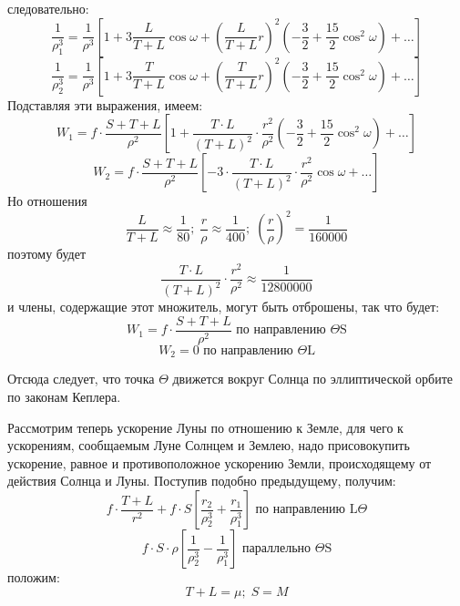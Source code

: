 \documentclass[a4paper,12pt]{article}
\begin{document}
\noindent следовательно:
\[ \frac{1}{\rho_1^3} = \frac{1}{\rho^3} \left[ 1+3\frac{L}{T+L}\cos{\omega} + \left(\frac{L}{T+L} r\right)^2\left(-\frac{3}{2} + \frac{15}{2}\cos^2{\omega} \right) + \ldots\right]\]
\[ \frac{1}{\rho_2^3} = \frac{1}{\rho^3} \left[ 1+3\frac{T}{T+L}\cos{\omega} + \left(\frac{T}{T+L} r\right)^2\left(-\frac{3}{2} + \frac{15}{2}\cos^2{\omega} \right) + \ldots\right]\]
Подставляя эти выражения, имеем:
\[ W_1 = f \cdot \frac{S+T+L}{\rho^2} \left[1+\frac{T \cdot L}{\left( T + L \right)^2} \cdot \frac{r^2}{\rho^2} \left(-\frac{3}{2} + \frac{15}{2} \cos^2{\omega} \right) + \ldots \right] \]
\[ W_2 = f \cdot \frac{S+T+L}{\rho^2} \left[-3\cdot\frac{T \cdot L}{\left( T + L \right)^2} \cdot \frac{r^2}{\rho^2} \cos{\omega} + \ldots \right] \]
Но отношения
\[ \frac{L}{T+L} \approx \frac{1}{80}; \; \frac{r}{\rho} \approx \frac{1}{400}; \; \left( \frac{r}{\rho} \right)^2 = \frac{1}{160000} \]
поэтому будет
\[ \frac{T \cdot L}{\left(T+L\right)^2} \cdot \frac{r^2}{\rho^2} \approx \frac{1}{12800000}\]
и члены, содержащие этот множитель, могут быть отброшены, так что будет:
\[ W_1 = f \cdot \frac{S+T+L}{\rho^2} \mbox{ по направлению $\Theta$S} \]
\[ W_2 = 0 \mbox{ по направлению $\Theta$L} \]

Отсюда следует, что точка $\Theta$ движется вокруг Солнца по эллиптической орбите по законам Кеплера. 

Рассмотрим теперь ускорение Луны по отношению к Земле, для чего к ускорениям, сообщаемым Луне Солнцем и Землею, надо присовокупить ускорение, равное и противоположное ускорению Земли, происходящему от действия Солнца и Луны. Поступив подобно предыдущему, получим:
\[ f \cdot \frac{T+L}{r^2}+f \cdot S \left[ \frac{r_2}{\rho_2^3} + \frac{r_1}{\rho_1^3} \right] \mbox{ по направлению L$\Theta$} \]
\[ f \cdot S \cdot \rho \left[ \frac{1}{\rho_2^3} - \frac{1}{\rho_1^3} \right] \mbox{ параллельно $\Theta$S} \]
положим:
\[ T + L = \mu; \; S = M \]

\listoffigures

\listoftables
\end{document}
